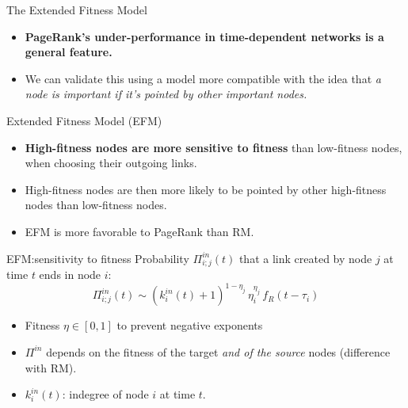 \begin{frame}{The Extended Fitness Model}
    \begin{itemize}
        \item \textbf{PageRank's under-performance in time-dependent networks is a general feature.}
        \item We can validate this using a model more compatible with the idea that \emph{a node is important if it's pointed by other important nodes.}
    \end{itemize}
    \begin{center}
        \alert{Extended Fitness Model} (EFM)
    \end{center}
    \begin{itemize}
        \item \textbf{High-fitness nodes are more sensitive to fitness} than low-fitness nodes, when choosing their outgoing links.
        \item High-fitness nodes are then more likely to be pointed by other high-fitness nodes than low-fitness nodes.
        \item EFM is \alert{more favorable} to PageRank than RM.
    \end{itemize}
\end{frame}

\begin{frame}{EFM:\@ sensitivity to fitness}
    Probability $\Pi_{i;j}^{in}(t)$ that a link created by node $j$ at time $t$ ends in node $i$:
    \[
        \Pi_{i;j}^{in}(t) \sim (k_i^{in}(t)+1)^{1-\eta_j} \, \eta_i^{\eta_j} \, f_R(t-\tau_i)
    \]
    \begin{itemize}
        \item Fitness $\eta \in [0, 1]$ to prevent negative exponents
        \item $\Pi^{in}$ depends on the fitness of the target \emph{and of the source} nodes (difference with RM).
        \item $k_i^{in}(t)$: indegree of node $i$ at time $t$.
    \end{itemize}
\end{frame}

